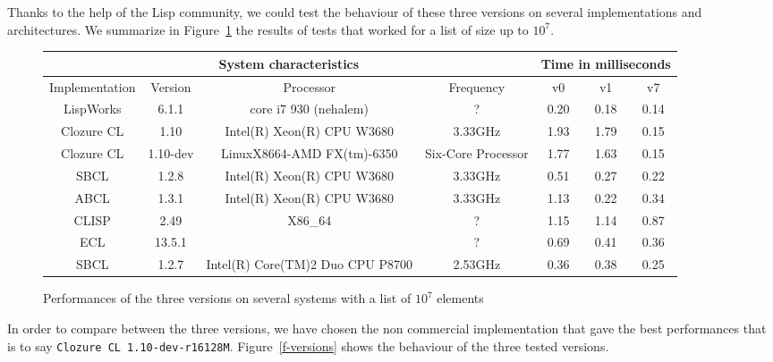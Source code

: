 
Thanks to the help of the Lisp community, we could test the behaviour
of these three versions on several implementations and architectures.
We summarize in Figure~\ref{f-systems} the results of tests that 
worked for a list of size up to $10^7$.

\begin{figure}[htb]
\centering
\begin{tabular}{|c|c|c|c|c|c|c|}
\hline
\multicolumn{4}{|c|}{System characteristics}  & \multicolumn{3}{|c|}{Time in milliseconds}\\ \hline
Implementation & Version      & Processor                  & Frequency          & v0 & v1 & v7 \\ \hline
LispWorks  & 6.1.1            & core i7 930 (nehalem)      &  ?                 & 0.20 & 0.18 & 0.14 \\ \hline
Clozure CL & 1.10     & Intel(R) Xeon(R) CPU W3680 & 3.33GHz            & 1.93 & 1.79 & 0.15 \\ \hline
Clozure CL & 1.10-dev & LinuxX8664-AMD FX(tm)-6350 & Six-Core Processor & 1.77 & 1.63 & 0.15 \\ \hline
SBCL       & 1.2.8 & Intel(R) Xeon(R) CPU W3680 & 3.33GHz            & 0.51 & 0.27 & 0.22 \\ \hline
ABCL       & 1.3.1            & Intel(R) Xeon(R) CPU W3680 & 3.33GHz            & 1.13 & 0.22 & 0.34 \\ \hline
CLISP      & 2.49             & X86\_64                    &   ?                & 1.15 & 1.14 & 0.87 \\ \hline
ECL        & 13.5.1           &                            &   ?                & 0.69 & 0.41 & 0.36 \\ \hline
SBCL       & 1.2.7 & Intel(R) Core(TM)2 Duo CPU P8700 & 2.53GHz      & 0.36 & 0.38 & 0.25 \\ \hline
\end{tabular}
\caption{\label{f-systems} Performances of the three versions on several systems with a list of $10^7$ elements}
\end{figure}

In order to compare between the three versions, we have chosen the non commercial implementation
that gave the best performances that is to say \texttt{Clozure CL 1.10-dev-r16128M}.
Figure~\ref{f-versions} shows the behaviour of the three tested versions.

